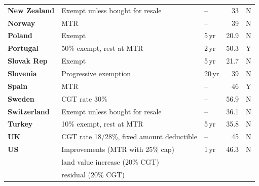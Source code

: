 \begin{subappendices}
\begin{table}
{\begin{tabular}[t]{>{\footnotesize}l>{\raggedleft\footnotesize}p{6.35cm}>{\raggedleft\footnotesize}p{1.20cm}>{\footnotesize}r>{\footnotesize\raggedleft\arraybackslash}p{1.40cm}}
 \textbf{New Zealand} & {Exempt unless bought for resale}                        & --                    & 33               & N\\
 \textbf{Norway}      & MTR                                                      & --                    & 39               & N \\
 \textbf{Poland}      & {Exempt}                                                 & {5\,yr}               & {20.9}           & {N} \\
 \textbf{Portugal}    & 50\% exempt, rest at MTR                                 & 2\,yr                 & 50.3             & Y \\
 \textbf{Slovak Rep}  & Exempt                                                   & 5\,yr                 & 21.7             & N \\
 \textbf{Slovenia}    & Progressive exemption                                    & 20\,yr                & 39               & N \\
 \textbf{Spain}       & MTR                                                      & --                    & 46               & Y \\
 \textbf{Sweden}      & CGT rate 30\%                                            & --                    & 56.9             & N \\
 \textbf{Switzerland} & Exempt unless bought for resale                          & --                    & 36.1             & N \\
 \textbf{Turkey}      & 10\% exempt, rest at MTR                                 & 5\,yr                 & 35.8             & N \\
 \textbf{UK}          & CGT rate 18/28\%, fixed amount deductible                & --                    & 45               & N \\
 {\textbf{US}}        & Improvements (MTR with 25\% cap)                         & {1\,yr}               & {46.3}           & {N} \\
                      & land value increase (20\% CGT)                           &                       &                  & \\
                      & residual (20\% CGT)                                      &                       &                  & \\
\bottomrule
\end{tabular}}
\end{table}


\end{subappendices}
